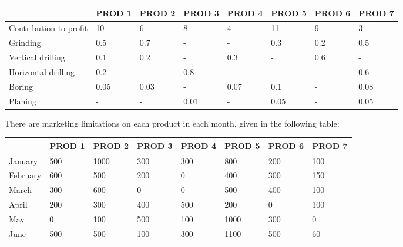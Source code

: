 \documentclass[12pt,a4paper]{article}
\theoremstyle{definition}
\begin{document}
\begin{enumerate}
    \begin{table}[htbp]
      \scriptsize
      \centering
      \renewcommand\arraystretch{1.1}
      \begin{tabular}{m{} m{}<{\centering} m{}<{\centering} m{}<{\centering} m{}<{\centering} m{}<{\centering} m{}<{\centering} m{}<{\centering}}
      \hline
       & \textbf{PROD 1} & \textbf{PROD 2} & \textbf{PROD 3} & \textbf{PROD 4} & \textbf{PROD 5} & \textbf{PROD 6} &  \textbf{PROD 7} \\\hline
      Contribution to profit & 10 & 6 & 8 & 4 & 11 & 9 & 3 \\
      Grinding & 0.5 & 0.7 & - & - & 0.3 & 0.2 & 0.5 \\
      Vertical drilling & 0.1 & 0.2 & - & 0.3 & - & 0.6 & - \\
      Horizontal drilling & 0.2 & - & 0.8 & - & - & - & 0.6 \\
      Boring & 0.05 & 0.03 & - & 0.07 & 0.1 & - & 0.08 \\
      Planing & - & - & 0.01 & - & 0.05 & - & 0.05 \\
      \hline
      \end{tabular}
    \end{table}

    There are marketing limitations on each product in each month, given in the following table:

    \begin{table}[htbp]
      \scriptsize
      \centering
      \renewcommand\arraystretch{1.1}
      \begin{tabular}{m{} m{}<{\centering} m{}<{\centering} m{}<{\centering} m{}<{\centering} m{}<{\centering} m{}<{\centering} m{}<{\centering}}
      \hline
       & \textbf{PROD 1} & \textbf{PROD 2} & \textbf{PROD 3} & \textbf{PROD 4} & \textbf{PROD 5} & \textbf{PROD 6} &  \textbf{PROD 7} \\\hline
      January & 500 & 1000 & 300 & 300 & 800 & 200 & 100 \\
      February & 600 & 500 & 200 & 0 & 400 & 300 & 150 \\
      March & 300 & 600 & 0 & 0 & 500 & 400 & 100 \\
      April & 200 & 300 & 400 & 500 & 200 & 0 & 100 \\
      May & 0 & 100 & 500 & 100 & 1000 & 300 & 0 \\
      June & 500 & 500 & 100 & 300 & 1100 & 500 & 60 \\
      \hline
      \end{tabular}
    \end{table}


\end{enumerate}
\end{document}

